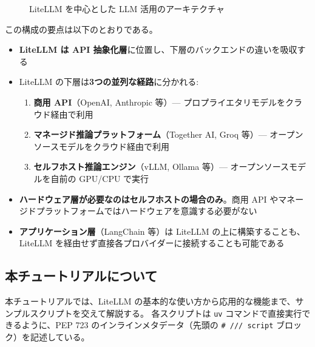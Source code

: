 \documentclass[a4paper,11pt]{ltjsarticle}
\newcommand{\code}[1]{\texttt{#1}}
\begin{document}
\begin{figure}[htbp]
\caption{LiteLLM を中心とした LLM 活用のアーキテクチャ}
\label{fig:architecture}
\end{figure}

この構成の要点は以下のとおりである。

\begin{itemize}
  \item \textbf{LiteLLM は API 抽象化層}に位置し、下層のバックエンドの違いを吸収する
  \item LiteLLM の下層は\textbf{3つの並列な経路}に分かれる:
    \begin{enumerate}
      \item \textbf{商用 API}（OpenAI, Anthropic 等）--- プロプライエタリモデルをクラウド経由で利用
      \item \textbf{マネージド推論プラットフォーム}（Together AI, Groq 等）--- オープンソースモデルをクラウド経由で利用
      \item \textbf{セルフホスト推論エンジン}（vLLM, Ollama 等）--- オープンソースモデルを自前の GPU/CPU で実行
    \end{enumerate}
  \item \textbf{ハードウェア層が必要なのはセルフホストの場合のみ}。商用 API やマネージドプラットフォームではハードウェアを意識する必要がない
  \item \textbf{アプリケーション層}（LangChain 等）は LiteLLM の上に構築することも、LiteLLM を経由せず直接各プロバイダーに接続することも可能である
\end{itemize}

\subsection{本チュートリアルについて}

本チュートリアルでは、LiteLLM の基本的な使い方から応用的な機能まで、サンプルスクリプトを交えて解説する。
各スクリプトは \code{uv} コマンドで直接実行できるように、PEP 723 のインラインメタデータ（先頭の \code{\# /// script} ブロック）を記述している。
\end{document}
